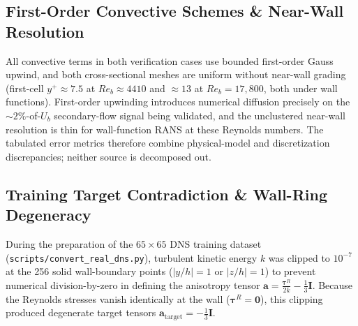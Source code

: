 \documentclass[11pt,a4paper]{article}
\begin{document}
\subsection{First-Order Convective Schemes \& Near-Wall Resolution}
All convective terms in both verification cases use bounded first-order Gauss upwind, and both cross-sectional meshes are uniform without near-wall grading (first-cell $y^+ \approx 7.5$ at $Re_b \approx 4410$ and $\approx 13$ at $Re_b = 17{,}800$, both under wall functions). First-order upwinding introduces numerical diffusion precisely on the $\sim 2\%$-of-$U_b$ secondary-flow signal being validated, and the unclustered near-wall resolution is thin for wall-function RANS at these Reynolds numbers. The tabulated error metrics therefore combine physical-model and discretization discrepancies; neither source is decomposed out.

\subsection{Training Target Contradiction \& Wall-Ring Degeneracy}
During the preparation of the $65 \times 65$ DNS training dataset (\texttt{scripts/convert\_real\_dns.py}), turbulent kinetic energy $k$ was clipped to $10^{-7}$ at the 256 solid wall-boundary points ($|y/h| = 1$ or $|z/h| = 1$) to prevent numerical division-by-zero in defining the anisotropy tensor $\mathbf{a} = \frac{\boldsymbol{\tau}^R}{2k} - \frac{1}{3}\mathbf{I}$. Because the Reynolds stresses vanish identically at the wall ($\boldsymbol{\tau}^R = \mathbf{0}$), this clipping produced degenerate target tensors $\mathbf{a}_{\text{target}} = -\frac{1}{3}\mathbf{I}$.
\end{document}
